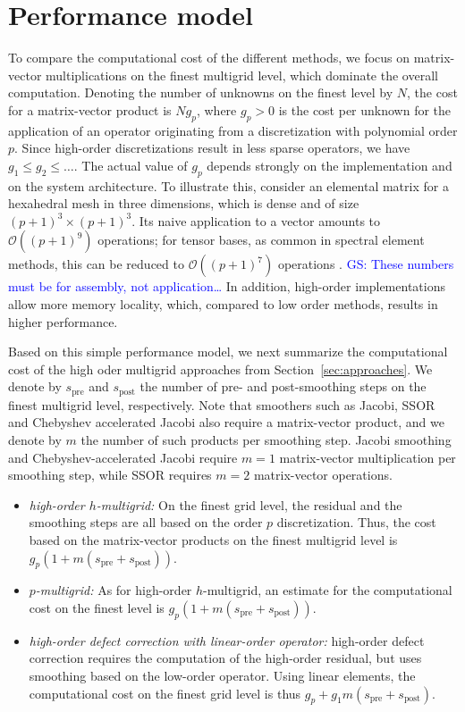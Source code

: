 \documentclass[smallcondensed,final]{svjour3}     %
\newcommand{\gsnote}[1]{\textcolor{blue}{GS: #1}}
\begin{document}
\section{Performance model}
To compare the computational cost of the different methods, we focus
on matrix-vector multiplications on the finest multigrid level, which
dominate the overall computation. Denoting the number of unknowns on
the finest level by $N$, the cost for a matrix-vector product is
$Ng_p$, where $g_p>0$ is the cost per unknown for the application of
an operator originating from a discretization with polynomial order
$p$. Since high-order discretizations result in less sparse operators,
we have $g_1\le g_2\le \ldots$. The actual value of $g_p$ depends
strongly on the implementation and on the system architecture. To
illustrate this, consider an elemental matrix for a hexahedral mesh in
three dimensions, which is dense and of size $(p+1)^3\times
(p+1)^3$. Its naive application to a vector amounts to $\mathcal
O((p+1)^9)$ operations; for tensor bases, as common in spectral
element methods, this can be reduced to $\mathcal O((p+1)^7)$
operations \cite{DevilleFischerMund02}. \gsnote{These numbers must be
  for assembly, not application\ldots} In addition, high-order
implementations allow more memory locality, which, compared to low
order methods, results in higher performance.

Based on this simple performance model, we next summarize the
computational cost of the high oder multigrid approaches from
Section~\ref{sec:approaches}. We denote by $s_\text{pre}$ and
$s_\text{post}$ the number of pre- and post-smoothing steps on the
finest multigrid level, respectively. Note that smoothers such as
Jacobi, SSOR and Chebyshev accelerated Jacobi also require a
matrix-vector product, and we denote by $m$ the number of such
products per smoothing step.  Jacobi smoothing and
Chebyshev-accelerated Jacobi require $m=1$ matrix-vector
multiplication per smoothing step, while SSOR requires $m=2$
matrix-vector operations.

\begin{itemize}
\item {\em high-order $h$-multigrid:} On the finest grid level, the
  residual and the smoothing steps are all based on the order $p$
  discretization. Thus, the cost based on the matrix-vector products
  on the finest multigrid level is
  $g_p(1+m(s_\text{pre}+s_\text{post}))$.

\item {\em $p$-multigrid:} As for high-order $h$-multigrid, an
  estimate for the computational cost on the finest level is
  $g_p(1+m(s_\text{pre}+s_\text{post}))$.

\item {\em high-order defect correction with linear-order operator:}
  high-order defect correction requires the computation of the
  high-order residual, but uses smoothing based on the low-order
  operator. Using linear elements, the computational cost on the
  finest grid level is thus
  $g_p+g_1m(s_\text{pre}+s_\text{post})$.
\end{itemize}
\end{document}
